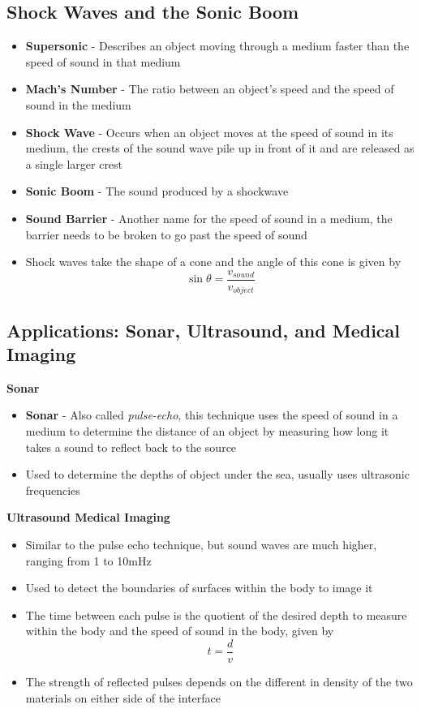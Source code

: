 \subsection{Shock Waves and the Sonic Boom}
\begin{itemize}
    \item \textbf{Supersonic} - Describes an object moving through a medium faster than the speed of sound in that medium
    \item \textbf{Mach's Number} - The ratio between an object's speed and the speed of sound in the medium
    \item \textbf{Shock Wave} - Occurs when an object moves at the speed of sound in its medium, the crests of the sound wave pile up in front of it and are released as a single larger crest
    \item \textbf{Sonic Boom} - The sound produced by a shockwave
    \item \textbf{Sound Barrier} - Another name for the speed of sound in a medium, the barrier needs to be broken to go past the speed of sound
    \item Shock waves take the shape of a cone and the angle of this cone is given by \[\sin\theta=\frac{v_{sound}}{v_{object}}\]
\end{itemize}

\subsection{Applications: Sonar, Ultrasound, and Medical Imaging}
\textbf{Sonar}
\begin{itemize}
    \item \textbf{Sonar} - Also called \emph{pulse-echo}, this technique uses the speed of sound in a medium to determine the distance of an object by measuring how long it takes a sound to reflect back to the source
    \item Used to determine the depths of object under the sea, usually uses ultrasonic frequencies
\end{itemize}

\textbf{Ultrasound Medical Imaging}
\begin{itemize}
    \item Similar to the pulse echo technique, but sound waves are much higher, ranging from 1 to 10mHz
    \item Used to detect the boundaries of surfaces within the body to image it
    \item The time between each pulse is the quotient of the desired depth to measure within the body and the speed of sound in the body, given by \[t=\frac{d}{v}\]
    \item The strength of reflected pulses depends on the different in density of the two materials on either side of the interface
\end{itemize}

\newpage